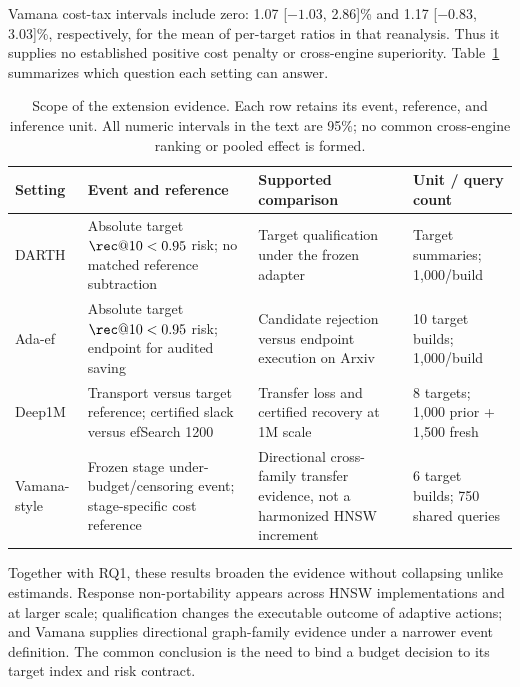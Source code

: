 Vamana cost-tax intervals include zero: 1.07 [$-1.03$, 2.86]\% and 1.17 [$-0.83$, 3.03]\%, respectively, for the mean of per-target ratios in that reanalysis. Thus it supplies no established positive cost penalty or cross-engine superiority. Table~\ref{tab:scope} summarizes which question each setting can answer.

\begin{table}[t]
\caption{Scope of the extension evidence. Each row retains its event, reference, and inference unit. All numeric intervals in the text are 95\%; no common cross-engine ranking or pooled effect is formed.}
\label{tab:scope}
\small\begin{tabularx}{\textwidth}{@{}lXXl@{}}\toprule
Setting & Event and reference & Supported comparison & Unit / query count\\\midrule
DARTH & Absolute target $\rec@10<0.95$ risk; no matched reference subtraction & Target qualification under the frozen adapter & Target summaries; 1,000/build\\
Ada-ef & Absolute target $\rec@10<0.95$ risk; endpoint for audited saving & Candidate rejection versus endpoint execution on Arxiv & 10 target builds; 1,000/build\\
Deep1M & Transport versus target reference; certified slack versus efSearch 1200 & Transfer loss and certified recovery at 1M scale & 8 targets; 1,000 prior + 1,500 fresh\\
Vamana-style & Frozen stage under-budget/censoring event; stage-specific cost reference & Directional cross-family transfer evidence, not a harmonized HNSW increment & 6 target builds; 750 shared queries\\\bottomrule
\end{tabularx}
\end{table}

Together with RQ1, these results broaden the evidence without collapsing unlike estimands. Response non-portability appears across HNSW implementations and at larger scale; qualification changes the executable outcome of adaptive actions; and Vamana supplies directional graph-family evidence under a narrower event definition. The common conclusion is the need to bind a budget decision to its target index and risk contract.
